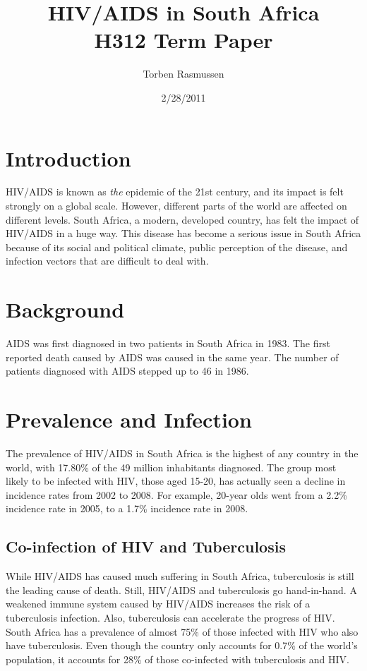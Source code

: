 \documentclass[12pt]{report}
\title{HIV/AIDS in South Africa \\ \normalsize{H312 Term Paper}}
\author{Torben Rasmussen}
\date{2/28/2011}
\begin{document}
\pagestyle{fancy}
\maketitle
\newpage

\section{Introduction}
HIV/AIDS is known as \emph{the} epidemic of the 21st century, and its impact is felt strongly on a global scale.
However, different parts of the world are affected on different levels.  
South Africa, a modern, developed country, has felt the impact of HIV/AIDS in a huge way.  
This disease has become a serious issue in South Africa because of its social and political climate, public perception of the disease, and infection vectors that are difficult to deal with. 

\section{Background}
AIDS was first diagnosed in two patients in South Africa in 1983.  The first reported death caused by AIDS was caused in the same year.
The number of patients diagnosed with AIDS stepped up to 46 in 1986.

\section{Prevalence and Infection}
The prevalence of HIV/AIDS in South Africa is the highest of any country in the world, with 17.80\% of the 49 million inhabitants diagnosed\cite{cia}.
The group most likely to be infected with HIV, those aged 15-20, has actually seen a decline in incidence rates from 2002 to 2008\cite{shisana}.
For example, 20-year olds went from a 2.2\% incidence rate in 2005, to a 1.7\% incidence rate in 2008.

\subsection{Co-infection of HIV and Tuberculosis}
While HIV/AIDS has caused much suffering in South Africa, tuberculosis is still the leading cause of death.
Still, HIV/AIDS and tuberculosis go hand-in-hand.
A weakened immune system caused by HIV/AIDS increases the risk of a tuberculosis infection.
Also, tuberculosis can accelerate the progress of HIV.
South Africa has a prevalence of almost 75\% of those infected with HIV who also have tuberculosis.
Even though the country only accounts for 0.7\% of the world's population, it accounts for 28\% of those co-infected with tuberculosis and HIV.
\end{document}
